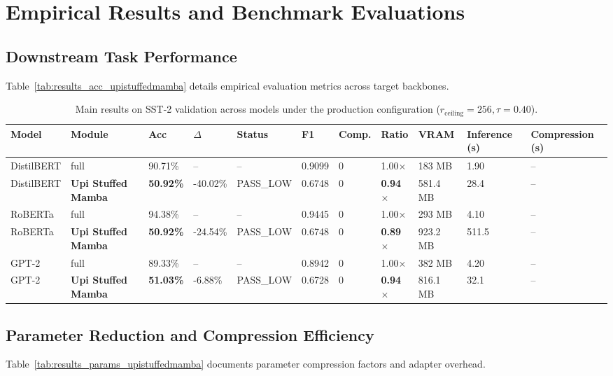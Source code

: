 \section{Empirical Results and Benchmark Evaluations}

\subsection{Downstream Task Performance}
Table~\ref{tab:results_acc_upistuffedmamba} details empirical evaluation metrics across target backbones.

\begin{table}[t]
\centering
\small
\begin{tabular}{lllllllllll}
\toprule
\textbf{Model} & \textbf{Module} & \textbf{Acc} & \textbf{$\Delta$} & \textbf{Status} & \textbf{F1} & \textbf{Comp.} & \textbf{Ratio} & \textbf{VRAM} & \textbf{Inference (s)} & \textbf{Compression (s)} \\
\midrule
DistilBERT & full & 90.71\% & -- & -- & 0.9099 & 0 & 1.00$\times$ & 183 MB & 1.90 & -- \\
DistilBERT & \textbf{Upi Stuffed Mamba} & \textbf{50.92\%} & -40.02\% & PASS\_LOW & 0.6748 & 0 & \textbf{0.94$\times$} & 581.4 MB & 28.4 & -- \\
RoBERTa & full & 94.38\% & -- & -- & 0.9445 & 0 & 1.00$\times$ & 293 MB & 4.10 & -- \\
RoBERTa & \textbf{Upi Stuffed Mamba} & \textbf{50.92\%} & -24.54\% & PASS\_LOW & 0.6748 & 0 & \textbf{0.89$\times$} & 923.2 MB & 511.5 & -- \\
GPT-2 & full & 89.33\% & -- & -- & 0.8942 & 0 & 1.00$\times$ & 382 MB & 4.20 & -- \\
GPT-2 & \textbf{Upi Stuffed Mamba} & \textbf{51.03\%} & -6.88\% & PASS\_LOW & 0.6728 & 0 & \textbf{0.94$\times$} & 816.1 MB & 32.1 & -- \\
\bottomrule
\end{tabular}
\caption{Main results on SST-2 validation across models under the production configuration ($r_{\mathrm{ceiling}}=256, \tau=0.40$).}
\label{tab:main_sst2}
\end{table}

\subsection{Parameter Reduction and Compression Efficiency}
Table~\ref{tab:results_params_upistuffedmamba} documents parameter compression factors and adapter overhead.

